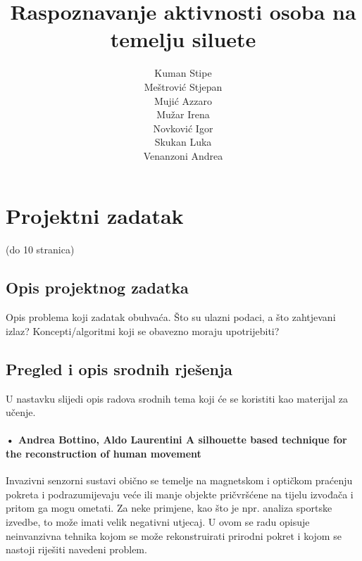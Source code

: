 \documentclass[times, utf8, diplomski]{fer}
\begin{document}
\title{ Raspoznavanje aktivnosti osoba na temelju siluete }


\author{ \begin{tabular}{ l }
	Kuman Stipe \\
	Meštrović Stjepan \\
	Mujić Azzaro \\
	Mužar Irena \\
	Novković Igor \\
	Skukan Luka \\
	Venanzoni Andrea \\
\end{tabular}  }

\maketitle

\zahvala{}

\tableofcontents


\chapter{Projektni zadatak}

(do 10 stranica)

\section{Opis projektnog zadatka}

Opis problema koji zadatak obuhvaća. Što su ulazni podaci, a što zahtjevani izlaz? Koncepti/algoritmi koji se obavezno moraju upotrijebiti?

\section{Pregled i opis srodnih rješenja}

U nastavku slijedi opis radova srodnih tema koji će se koristiti kao materijal za učenje.


\subsubsection{ • Andrea Bottino, Aldo Laurentini
A silhouette based technique for the reconstruction of human movement }


Invazivni senzorni sustavi obično se temelje na magnetskom i optičkom praćenju pokreta i
podrazumijevaju veće ili manje objekte pričvršćene na tijelu izvođača i pritom ga mogu
ometati. Za neke primjene, kao što je npr. analiza sportske izvedbe, to može imati velik
negativni utjecaj. U ovom se radu opisuje neinvanzivna tehnika kojom se može rekonstruirati
prirodni pokret i kojom se nastoji riješiti navedeni problem.
\end{document}
